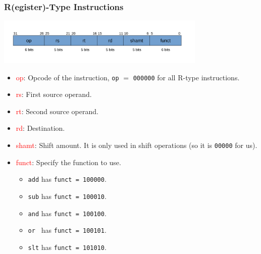\documentclass{beamer}
\begin{document}
\begin{frame}%
\frametitle{R(egister)-Type Instructions}

\begin{center}
  \includegraphics[width=10cm]{rtype.pdf}
\end{center}

\scriptsize

\vspace{-0.3cm}

\begin{itemize}
\item \textcolor{red}{op}: Opcode of the instruction, \texttt{op} $=$ \texttt{000000} for all R-type instructions.
\vspace{0.1cm}
\item \textcolor{red}{rs}: First source operand.
\vspace{0.1cm}
\item \textcolor{red}{rt}: Second source operand.
\vspace{0.1cm}
\item \textcolor{red}{rd}: Destination.
\vspace{0.1cm}
\item \textcolor{red}{shamt}: Shift amount. It is only used in shift operations (so it is \texttt{00000} for us).
\vspace{0.1cm}
\item \textcolor{red}{funct}: Specify the function to use.
  \begin{itemize}
    \scriptsize
  \item \lstinline{add} has \texttt{funct = 100000}.
  \item \lstinline{sub} has \texttt{funct = 100010}.
  \item \lstinline{and} has \texttt{funct = 100100}.
  \item \lstinline{or}\texttt{ }  has \texttt{funct = 100101}.
  \item \lstinline{slt} has \texttt{funct = 101010}.
  \end{itemize}

\end{itemize}

\end{frame}
\end{document}
